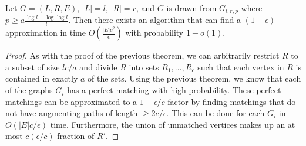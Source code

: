 \begin{thm}
Let $G=(L,R,E)$, $|L|=l$, $|R|=r$, and $G$ is drawn from
$G_{l,r,p}$ where $p \geq a\frac{\log l - \log\log l}{l}$. Then there
exists an algorithm that can find a $(1-\epsilon)$-approximation in time
$O(\frac{|E|c^2}{\epsilon})$ with probability $1-o(1)$.
\end{thm}
\begin{proof}
As with the proof of the previous theorem, we can arbitrarily restrict $R$ to a
subset of size $lc/a$ and divide $R$ into sets $R_1,\ldots,R_c$ such that each
vertex in $R$ is contained in exactly $a$ of the sets. Using the previous
theorem, we know that each of the graphs $G_i$ has a perfect matching with high
probability. These perfect matchings can be approximated to a $1-\epsilon/c$
factor by finding matchings that do not have augmenting paths of length
$\geq 2c/\epsilon$. This can be done for each $G_i$ in $O(|E|c/\epsilon)$ time.
Furthermore, the union of unmatched vertices makes up an at most
$c(\epsilon/c)$ fraction of $R'$.
\end{proof}

